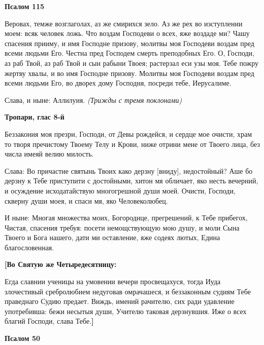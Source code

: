 \medskip
\bfseries Псалом 115\normalfont{}


Веровах, темже возглаголах, аз же смирихся зело. Аз же рех во изступлении моем: всяк человек ложь. Что воздам Господеви о всех, яже воздаде ми? Чашу спасения прииму, и имя Господне призову, молитвы моя Господеви воздам пред всеми людьми Его. Честна пред Господем смерть преподобных Его. О, Господи, аз раб Твой, аз раб Твой и сын рабыни Твоея; растерзал еси узы моя. Тебе пожру жертву хвалы, и во имя Господне призову. Молитвы моя Господеви воздам пред всеми людьми Его, во дворех дому Господня, посреди тебе, Иерусалиме.


Слава, и ныне: Аллилуия. \itshape (Трижды с тремя поклонами)\normalfont{}


\medskip
\bfseries Тропари, глас 8-й\normalfont{}


Беззакония моя презри, Господи, от Девы рождейся, и сердце мое очисти, храм то творя пречистому Твоему Телу и Крови, ниже отрини мене от Твоего лица, без числа имеяй велию милость.


Слава: Во причастие святынь Твоих како дерзну [вниду], недостойный? Аше бо дерзну к Тебе приступити с достойными, хитон мя обличает, яко несть вечерний, и осуждение исходатайствую многогрешной души моей. Очисти, Господи, скверну души моея, и спаси мя, яко Человеколюбец.


И ныне: Многая множества моих, Богородице, прегрешений, к Тебе прибегох, Чистая, спасения требуя: посети немощствующую мою душу, и моли Сына Твоего и Бога нашего, дати ми оставление, яже содеях лютых, Едина благословенная.


\medskip
\bfseries [Во Святую же Четыредесятницу:\normalfont{}


Егда славнии ученицы на умовении вечери просвещахуся, тогда Иуда злочестивый сребролюбием недуговав омрачашеся, и беззаконным судиям Тебе праведнаго Судию предает. Виждь, имений рачителю, сих ради удавление употребивша: бежи несытыя души, Учителю таковая дерзнувшия. Иже о всех благий Господи, слава Тебе.\bfseries ]\normalfont{}


\medskip
\bfseries Псалом 50\normalfont{}


